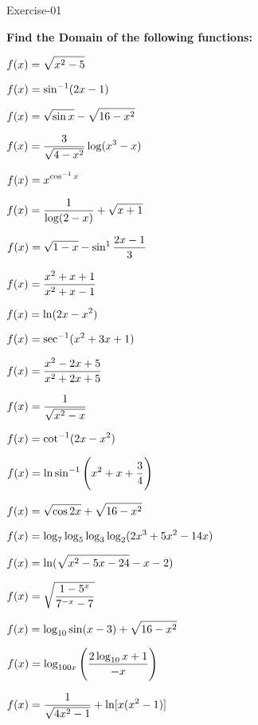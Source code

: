 \documentclass[addpoints]{exam}
\begin{document}
\begin{center}
\begin{LARGE}
Exercise-01\\
\end{LARGE}
\begin{large}
 \textbf{ Find the Domain of the following functions:}
\end{large}
\end{center}
\begin{questions}

\question $\mathlarger{f(x)= \sqrt{x^{2}-5}}$

\question $\mathlarger{f(x)= \sin^{-1}(2x-1)}$

\question $\mathlarger{f(x)= \sqrt{\sin x} -\sqrt{16-x^{2}}}$

\question $\mathlarger{f(x)= \dfrac{3}{\sqrt{4-x^{2}}}\log(x^{3}-x)}$

\question $\mathlarger{f(x)= x^{\cos^{-1}x}}$

\question $\mathlarger{f(x)= \dfrac{1}{\log(2-x)} +\sqrt{x+1}}$

\question $\mathlarger{f(x)= \sqrt{1-x} -\sin^{1}\dfrac{2x-1}{3}}$

\question $\mathlarger{f(x)= \dfrac{x^{2}+x+1}{x^{2}+x-1}}$

\question $\mathlarger{f(x)= \ln (2x-x^{2})}$

\question $\mathlarger{f(x)= \sec^{-1}(x^2 +3x+1)}$

\question $\mathlarger{f(x)= \dfrac{x^{2}-2x+5}{x^{2}+2x+5}}$

\question $\mathlarger{f(x)= \dfrac{1}{\sqrt{x^{2}-x}}}$

\question $\mathlarger{f(x)= \cot^{-1}(2x-x^{2})}$

\question $\mathlarger{f(x)= \ln\sin^{-1}\Bigg(x^2 +x+\dfrac{3}{4}\Bigg)}$

\question $\mathlarger{f(x)= \sqrt{\cos 2x} + \sqrt{16-x^2}}$

\question $\mathlarger{f(x)= \log_{7}\log_{5}\log_{3}\log_{2}(2x^3 +5x^2 -14x)}$

\question $\mathlarger{f(x)= \ln(\sqrt{x^2 -5x-24}-x-2)}$

\question $\mathlarger{f(x)= \sqrt{\dfrac{1-5^x}{7^{-x}-7}}}$

\question $\mathlarger{f(x)= \log_{10}\sin(x-3) +\sqrt{16-x^2}}$

\question $\mathlarger{f(x)= \log_{100x}\Bigg(\dfrac{2\log_{10}x+1}{-x}\Bigg)}$

\question $\mathlarger{f(x)= \dfrac{1}{\sqrt{4x^2 -1}}+\ln[x(x^2-1)]}$


\end{questions}
\end{document}
